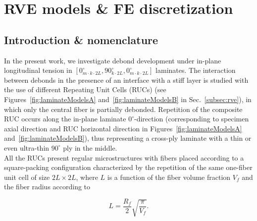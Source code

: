 \documentclass[review]{elsarticle}
\begin{document}
\section{RVE models \& FE discretization}


\subsection{Introduction \& nomenclature}\label{subsec:names}

In the present work, we investigate debond development under in-plane longitudinal tension in $\left[0_{m\cdot k\cdot2L}^{\circ},90_{k\cdot2L}^{\circ},0_{m\cdot k\cdot2L}^{\circ}\right]$ laminates. The interaction between debonds in the presence of an interface with a stiff layer is studied with the use of different Repeating Unit Cells (RUCs)  (see Figures~\ref{fig:laminateModelsA} and~\ref{fig:laminateModelsB} in Sec.~\ref{subsec:rve}), in which only the central fiber is partially debonded. Repetition of the composite RUC occurs along the in-plane laminate $0^{\circ}$-direction (corresponding to specimen axial direction and RUC horizontal direction in Figures~\ref{fig:laminateModelsA} and~\ref{fig:laminateModelsB}), thus representing a cross-ply laminate with a thin or even ultra-thin $90^{\circ}$ ply in the middle.\\
All the RUCs present regular microstructures with fibers placed according to a square-packing configuration characterized by the repetition of the same one-fiber unit cell of size $2L\times2L$, where $L$ is a function of the fiber volume fraction $V_{f}$ and the fiber radius according to

\begin{equation}\label{eq:LVf}
L=\frac{R_{f}}{2}\sqrt{\frac{\pi}{V_{f}}}.
\end{equation}
\end{document}

